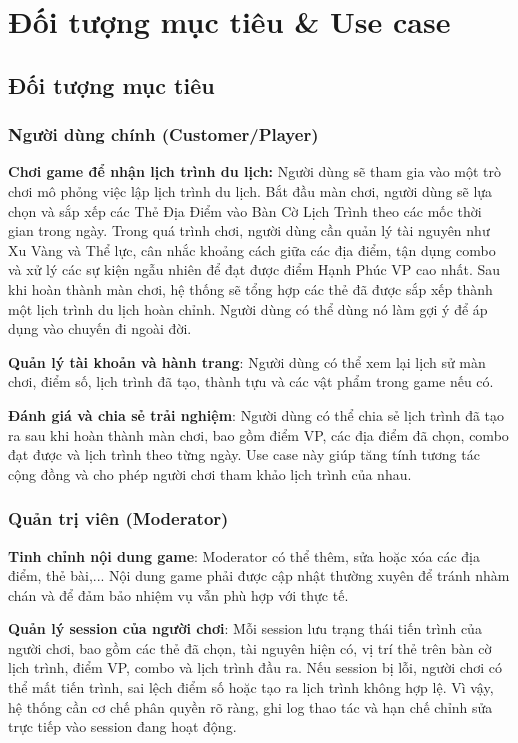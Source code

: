 \newpage

\chapter{Đối tượng mục tiêu \& Use case}

\section{Đối tượng mục tiêu}

\subsection{Người dùng chính (Customer/Player)}

\textbf{Chơi game để nhận lịch trình du lịch:} Người dùng sẽ tham gia vào một trò chơi mô phỏng việc lập lịch trình du lịch. Bắt đầu màn chơi, người dùng sẽ lựa chọn và sắp xếp các Thẻ Địa Điểm vào Bàn Cờ Lịch Trình theo các mốc thời gian trong ngày. Trong quá trình chơi, người dùng cần quản lý tài nguyên như Xu Vàng và Thể lực, cân nhắc khoảng cách giữa các địa điểm, tận dụng combo và xử lý các sự kiện ngẫu nhiên để đạt được điểm Hạnh Phúc VP cao nhất. Sau khi hoàn thành màn chơi, hệ thống sẽ tổng hợp các thẻ đã được sắp xếp thành một lịch trình du lịch hoàn chỉnh. Người dùng có thể dùng nó làm gợi ý để áp dụng vào chuyến đi ngoài đời.

\textbf{Quản lý tài khoản và hành trang}: Người dùng có thể xem lại lịch sử màn chơi, điểm số, lịch trình đã tạo, thành tựu và các vật phẩm trong game nếu có.

\textbf{Đánh giá và chia sẻ trải nghiệm}: Người dùng có thể chia sẻ lịch trình đã tạo ra sau khi hoàn thành màn chơi, bao gồm điểm VP, các địa điểm đã chọn, combo đạt được và lịch trình theo từng ngày. Use case này giúp tăng tính tương tác cộng đồng và cho phép người chơi tham khảo lịch trình của nhau.

\subsection{Quản trị viên (Moderator)}

\textbf{Tinh chỉnh nội dung game}: Moderator có thể thêm, sửa hoặc xóa các địa điểm, thẻ bài,... Nội dung game phải được cập nhật thường xuyên để tránh nhàm chán và để đảm bảo nhiệm vụ vẫn phù hợp với thực tế.

\textbf{Quản lý session của người chơi}: Mỗi session lưu trạng thái tiến trình của người chơi, bao gồm các thẻ đã chọn, tài nguyên hiện có, vị trí thẻ trên bàn cờ lịch trình, điểm VP, combo và lịch trình đầu ra. Nếu session bị lỗi, người chơi có thể mất tiến trình, sai lệch điểm số hoặc tạo ra lịch trình không hợp lệ. Vì vậy, hệ thống cần cơ chế phân quyền rõ ràng, ghi log thao tác và hạn chế chỉnh sửa trực tiếp vào session đang hoạt động.


